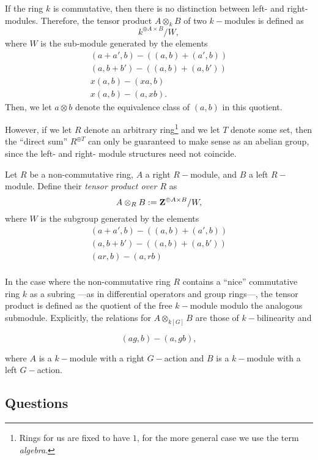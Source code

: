 \documentclass{amsart}
\begin{document}
\begin{defn}
	If the ring $k$ is commutative, then there is no distinction between left- and right-
	modules. Therefore, the tensor product $A \otimes_k B$ of two $k-$modules is defined as
	$$
	k^{\oplus A \times B}/W,
	$$
	where $W$ is the sub-module generated by the elements
	\begin{eqnarray*}
		(a+a', b) - \left( (a, b) + (a', b) \right) \\
		(a, b+b') - \left( (a, b) + (a, b') \right) \\
		x(a, b) - (xa, b) \\
		x(a, b) - (a, xb).
	\end{eqnarray*}
	Then, we let $a \otimes b$ denote the equivalence class of $(a, b)$ in this quotient.
\end{defn}

However, if we let $R$ denote an arbitrary ring\footnote{Rings for us are fixed to have $1$, for
the more general case we use the term \emph{algebra}.} and we let $T$ denote some set, then the
``direct sum'' $R^{\oplus T}$ can only be guaranteed to make sense as an abelian group, since the
left- and right- module structures need not coincide.

\begin{defn}
	Let $R$ be a non-commutative ring, $A$ a right $R-$module, and $B$ a left $R-$module.
	Define their \emph{tensor product over $R$} as
	$$
	A \otimes_R B := \mathbf{Z}^{\oplus A \times B}/W,
	$$
	where $W$ is the subgroup generated by the elements
	\begin{eqnarray*}
		(a+a', b) - \left( (a, b) + (a', b) \right) \\
		(a, b+b') - \left( (a, b) + (a, b') \right) \\
		(ar, b) - (a, rb) \\
	\end{eqnarray*}
\end{defn}

In the case where the non-commutative ring $R$ contains a ``nice'' commutative ring $k$ as a
subring ---as in differential operators and group rings---, the tensor product is defined as the
quotient of the free $k-$module modulo the analogous submodule. Explicitly, the relations for
$A \otimes_{k[G]} B$ are those of $k-$bilinearity and

$$
(ag, b) - (a, gb),
$$

where $A$ is a $k-$module with a right $G-$action and $B$ is a $k-$module with a left $G-$action.

\subsection{Questions}
\end{document}
